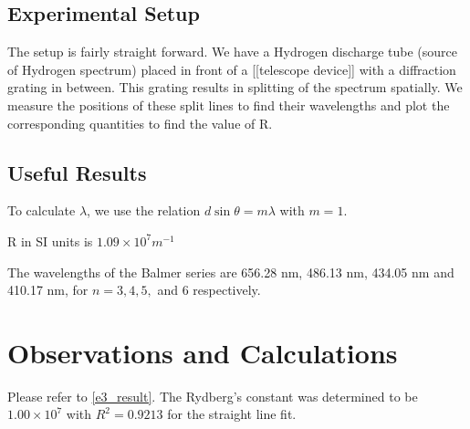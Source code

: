 	\subsection{Experimental Setup}	
		The setup is fairly straight forward. We have a Hydrogen discharge tube (source of Hydrogen spectrum) placed in front of a [[telescope device]] with a diffraction grating in between. This grating results in splitting of the spectrum spatially. We measure the positions of these split lines to find their wavelengths and plot the corresponding quantities to find the value of R.
	\subsection{Useful Results}
		To calculate $\lambda$, we use the relation $d \sin \theta = m \lambda$ with $m = 1$.
		\par
		R in SI units is $1.09 \times 10^7 m^{-1}$
		\par
		The wavelengths of the Balmer series are 656.28 nm, 486.13 nm, 434.05 nm and 410.17 nm, for $n = 3, 4, 5,$ and $6$ respectively.
\section{Observations and Calculations}
	Please refer to \autoref{e3_result}. The Rydberg's constant was determined to be $1.00 \times 10^{7}$ with $R^2=0.9213$ for the straight line fit.


